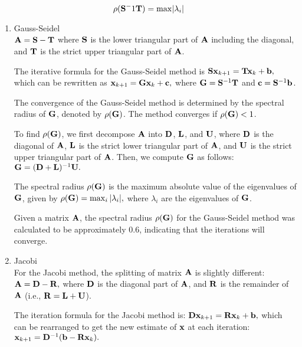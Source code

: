 \begin{equation*}
  \rho(\mathbf{S}^-1\mathbf{T}) = \max \lvert\lambda_i\rvert
\end{equation*}
\begin{enumerate}
  \item Gauss-Seidel\\
    
    $ \mathbf{A} = \mathbf{S} - \mathbf{T} $
    where $ \mathbf{S} $ is the lower triangular part of $ \mathbf{A} $ including the diagonal, and $ \mathbf{T} $ is the strict upper triangular part of $ \mathbf{A} $.

    The iterative formula for the Gauss-Seidel method is
    $ \mathbf{Sx}_{k+1} = \mathbf{Tx}_k + \mathbf{b}, $
    which can be rewritten as
    $ \mathbf{x}_{k+1} = \mathbf{Gx}_k + \mathbf{c}, $
    where $ \mathbf{G} = \mathbf{S}^{-1}\mathbf{T} $ and $ \mathbf{c} = \mathbf{S}^{-1}\mathbf{b} $.

    The convergence of the Gauss-Seidel method is determined by the spectral radius of $ \mathbf{G} $, denoted by $ \rho(\mathbf{G}) $. The method converges if $ \rho(\mathbf{G}) < 1 $.

    To find $ \rho(\mathbf{G}) $, we first decompose $ \mathbf{A} $ into $ \mathbf{D} $, $ \mathbf{L} $, and $ \mathbf{U} $, where $ \mathbf{D} $ is the diagonal of $ \mathbf{A} $, $ \mathbf{L} $ is the strict lower triangular part of $ \mathbf{A} $, and $ \mathbf{U} $ is the strict upper triangular part of $ \mathbf{A} $. Then, we compute $ \mathbf{G} $ as follows:
    $ \mathbf{G} = (\mathbf{D} + \mathbf{L})^{-1}\mathbf{U}. $

    The spectral radius $ \rho(\mathbf{G}) $ is the maximum absolute value of the eigenvalues of $ \mathbf{G} $, given by
    $ \rho(\mathbf{G}) = \max_i |\lambda_i|, $
    where $ \lambda_i $ are the eigenvalues of $ \mathbf{G} $.

    Given a matrix $ \mathbf{A} $, the spectral radius $ \rho(\mathbf{G}) $ for the Gauss-Seidel method was calculated to be approximately 0.6, indicating that the iterations will converge.
  
  \item Jacobi \\
    For the Jacobi method, the splitting of matrix $ \mathbf{A} $ is slightly different:
    $ \mathbf{A} = \mathbf{D} - \mathbf{R}, $
    where $ \mathbf{D} $ is the diagonal part of $ \mathbf{A} $, and $ \mathbf{R} $ is the remainder of $ \mathbf{A} $ (i.e., $ \mathbf{R} = \mathbf{L} + \mathbf{U} $).

    The iteration formula for the Jacobi method is:
    $ \mathbf{Dx}_{k+1} = \mathbf{Rx}_k + \mathbf{b}, $
    which can be rearranged to get the new estimate of $ \mathbf{x} $ at each iteration:
    $ \mathbf{x}_{k+1} = \mathbf{D}^{-1}(\mathbf{b} - \mathbf{Rx}_k). $


\end{enumerate}

